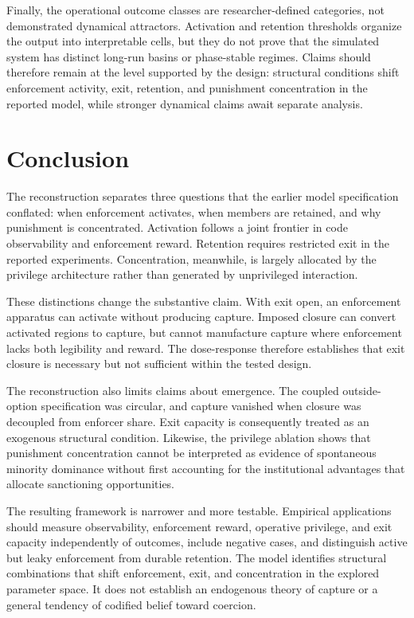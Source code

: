 \documentclass[12pt]{article}
\begin{document}
Finally, the operational outcome classes are researcher-defined categories, not demonstrated dynamical attractors. Activation and retention thresholds organize the output into interpretable cells, but they do not prove that the simulated system has distinct long-run basins or phase-stable regimes. Claims should therefore remain at the level supported by the design: structural conditions shift enforcement activity, exit, retention, and punishment concentration in the reported model, while stronger dynamical claims await separate analysis.

\section{Conclusion}

The reconstruction separates three questions that the earlier model specification conflated: when enforcement activates, when members are retained, and why punishment is concentrated. Activation follows a joint frontier in code observability and enforcement reward. Retention requires restricted exit in the reported experiments. Concentration, meanwhile, is largely allocated by the privilege architecture rather than generated by unprivileged interaction.

These distinctions change the substantive claim. With exit open, an enforcement apparatus can activate without producing capture. Imposed closure can convert activated regions to capture, but cannot manufacture capture where enforcement lacks both legibility and reward. The dose-response therefore establishes that exit closure is necessary but not sufficient within the tested design.

The reconstruction also limits claims about emergence. The coupled outside-option specification was circular, and capture vanished when closure was decoupled from enforcer share. Exit capacity is consequently treated as an exogenous structural condition. Likewise, the privilege ablation shows that punishment concentration cannot be interpreted as evidence of spontaneous minority dominance without first accounting for the institutional advantages that allocate sanctioning opportunities.

The resulting framework is narrower and more testable. Empirical applications should measure observability, enforcement reward, operative privilege, and exit capacity independently of outcomes, include negative cases, and distinguish active but leaky enforcement from durable retention. The model identifies structural combinations that shift enforcement, exit, and concentration in the explored parameter space. It does not establish an endogenous theory of capture or a general tendency of codified belief toward coercion.
\end{document}
